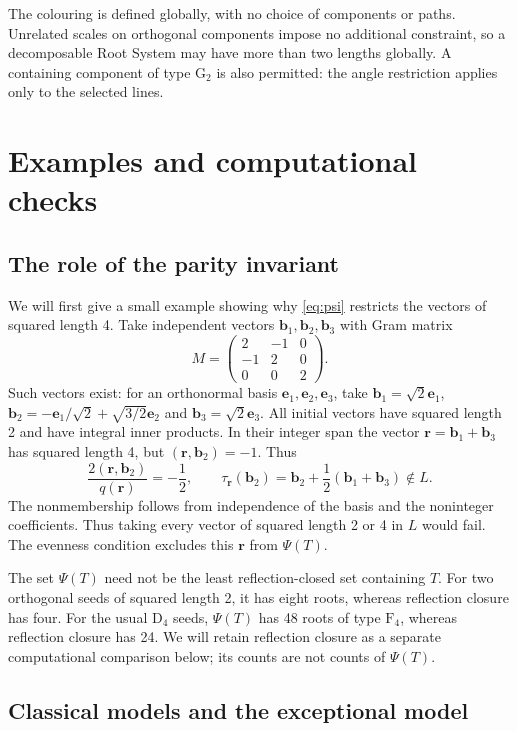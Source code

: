 \documentclass[11pt]{amsart}
\newcommand\pmat[1]{\begin{pmatrix} #1 \end{pmatrix}}
\theoremstyle{definition}
\newcommand{\typ}[1]{\mathrm{#1}}
\newcommand{\Zr}{{\mathbf r}}
\newcommand{\Ze}{{\mathbf e}}
\newcommand{\Zb}{{\mathbf b}}
\begin{document}
The colouring is defined globally, with no choice of components or paths.
Unrelated scales on orthogonal components impose no additional constraint,
so a decomposable Root System may have more than two lengths globally.
A containing component of type $\typ G_2$ is also permitted: the angle
restriction applies only to the selected lines.

\section{Examples and computational checks}\label{sec:checks}

\subsection{The role of the parity invariant}

We will first give a small example showing why \eqref{eq:psi} restricts
the vectors of squared length 4. Take independent vectors
$\Zb_1,\Zb_2,\Zb_3$ with Gram matrix
\[
 M=\pmat{2&-1&0\\-1&2&0\\0&0&2}.
\]
Such vectors exist: for an orthonormal basis $\Ze_1,\Ze_2,\Ze_3$,
take $\Zb_1=\sqrt2\Ze_1$,
$\Zb_2=-\Ze_1/\sqrt2+\sqrt{3/2}\Ze_2$ and
$\Zb_3=\sqrt2\Ze_3$.
All initial vectors have squared length 2 and have integral inner
products. In their integer span the vector $\Zr=\Zb_1+\Zb_3$
has squared length 4, but $(\Zr,\Zb_2)=-1$. Thus
\[
 \frac{2(\Zr,\Zb_2)}{q(\Zr)}=-\frac12,
 \qquad
 \tau_{\Zr}(\Zb_2)=\Zb_2+\frac12(\Zb_1+\Zb_3)\notin L.
\]
The nonmembership follows from independence of the basis and the
noninteger coefficients. Thus taking every vector of squared length
2 or 4 in $L$ would fail. The evenness condition excludes this $\Zr$
from $\Psi(T)$.

The set $\Psi(T)$ need not be the least reflection-closed set containing
$T$. For two orthogonal seeds of squared length 2, it has eight roots,
whereas reflection closure has four. For the usual $\typ D_4$ seeds,
$\Psi(T)$ has 48 roots of type $\typ F_4$, whereas reflection closure
has 24. We will retain reflection closure as a separate computational
comparison below; its counts are not counts of $\Psi(T)$.

\subsection{Classical models and the exceptional model}
\end{document}
